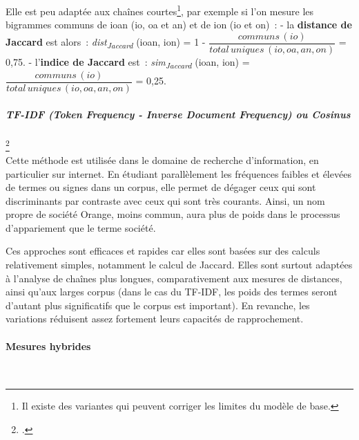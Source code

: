 \documentclass[a4paper,12pt,twoside]{book}
\begin{document}
                Elle est peu adaptée aux chaînes courtes\footnote{Il existe des variantes qui peuvent corriger les limites du modèle de base.}, par exemple si l'on mesure les bigrammes communs de ioan (io, oa et an) et de ion (io et on)~:
                \vspace{0.2cm}
                \newline
                - la \textbf{distance de Jaccard} est alors~:
                \vspace{0.2cm}
                \newline
                \textit{dist\textsubscript{Jaccard}} (ioan, ion) = 1 - $ \dfrac{communs\,(io)}{total\, uniques\,(io, oa, an, on)} $ = 0,75.
                \newline
                \newline
                - l'\textbf{indice de Jaccard} est~:
                \bigskip
                \textit{sim\textsubscript{Jaccard}} (ioan, ion) = $ \dfrac{communs\,(io)}{total\,uniques\,(io, oa, an, on)} $ = 0,25.
                
                \newpage
                
                
                \subparagraph{TF-IDF (Token Frequency - Inverse Document Frequency) ou Cosinus}\footcite{TFIDF2022} \\
                
                Cette méthode est utilisée dans le domaine de recherche d’information, en particulier sur internet. En étudiant parallèlement les fréquences faibles et élevées de termes ou signes dans un corpus, elle permet de dégager ceux qui sont discriminants par contraste avec ceux qui sont très courants. Ainsi, un nom propre de société \og{}Orange\fg{}, moins commun, aura plus de poids dans le processus d'appariement que le terme \og{}société\fg{}.
                \newline
                
                Ces approches sont efficaces et rapides car elles sont basées sur des calculs relativement simples, notamment le calcul de Jaccard. Elles sont surtout adaptées à l'analyse de chaînes plus longues, comparativement aux mesures de distances, ainsi qu'aux larges corpus (dans le cas du TF-IDF, les poids des termes seront d'autant plus significatifs que le corpus est important). En revanche, les variations réduisent assez fortement leurs capacités de rapprochement.
                
                \paragraph{Mesures hybrides}\mbox{} \\
                
\end{document}
